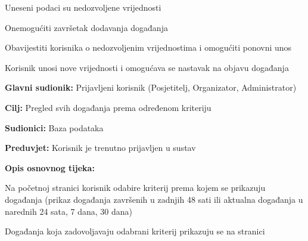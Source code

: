 \begin{packed_item}
\begin{packed_item}
								\item[2.a] Uneseni podaci su nedozvoljene vrijednosti
								\item[] \begin{packed_enum}
									
									\item Onemogućiti završetak dodavanja događanja
									\item Obavijestiti korisnika o nedozvoljenim vrijednostima i omogućiti ponovni unos 
									\item Korisnik unosi nove vrijednosti i omogućava se nastavak na objavu događanja
									
								\end{packed_enum}		
							\end{packed_item}
							
					\end{packed_item}
					
					\newpage

					\noindent {}
					\begin{packed_item}
						
						\item \textbf{Glavni sudionik:} Prijavljeni korisnik (Posjetitelj, Organizator, Administrator)
						\item  \textbf{Cilj:} Pregled svih događanja prema određenom kriteriju
						\item  \textbf{Sudionici:} Baza podataka
						\item  \textbf{Preduvjet:} Korisnik je trenutno prijavljen u sustav 
						\item  \textbf{Opis osnovnog tijeka:}
						
						\item[] \begin{packed_enum}
							
							\item Na početnoj stranici korisnik odabire kriterij prema kojem se prikazuju događanja (prikaz događanja završenih u zadnjih 48 sati ili aktualna događanja u narednih 24 sata, 7 dana, 30 dana)
							\item Događanja koja zadovoljavaju odabrani kriterij prikazuju se na stranici
						
						\end{packed_enum}
						
					\end{packed_item}
					
